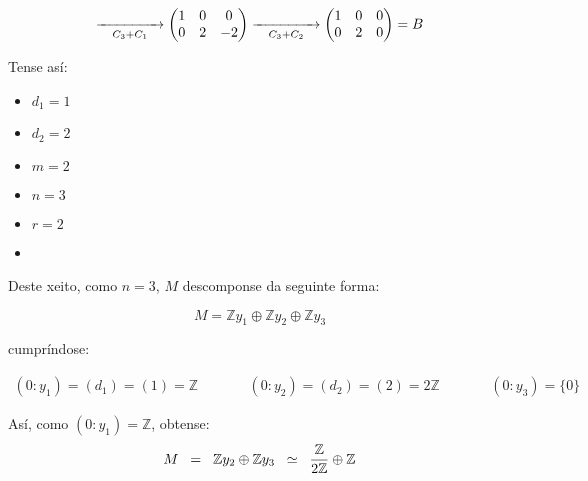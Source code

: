 \documentclass[twoside]{report}
\theoremstyle{mystyle}
\begin{document}
\vspace{3mm}

$$
\underset{C_{3} + C_{1}}{\xrightarrow{\hspace{15mm}}}
\begin{pmatrix}
1 & 0 & 0 \\
0 & 2 & -2
\end{pmatrix}
\underset{C_{3} + C_{2}}{\xrightarrow{\hspace{15mm}}}
\begin{pmatrix}
1 & 0 & 0 \\
0 & 2 & 0
\end{pmatrix}
= B
$$

\vspace{3mm}

\noindent Tense así:

\begin{multicols}{3}
\begin{itemize}
    \item $d_{1} = 1$
    \item $d_{2} = 2$
    \item $m = 2$
    \item $n = 3$
    \item $r = 2$
    \item[\vspace{\fill}]
\end{itemize}
\end{multicols}

\vspace{3mm}

\noindent Deste xeito, como $n = 3$, $M$ descomponse da seguinte forma:

$$M = \mathbb{Z}y_{1} \oplus \mathbb{Z}y_{2} \oplus \mathbb{Z}y_{3}$$

\vspace{3mm}

\noindent cumpríndose:

\begin{align*}
    (0 : y_{1}) = (d_{1}) = (1) = \mathbb{Z} & \qquad &  (0:y_{2}) = (d_{2}) = (2) = 2\mathbb{Z} & \qquad & (0 : y_{3}) = \{0\}
\end{align*}

\pagebreak

\noindent Así, como $(0 : y_{1}) = \mathbb{Z}$, obtense: 
$$M \hspace{2mm} = \hspace{2mm} \mathbb{Z}y_{2} \oplus \mathbb{Z}y_{3} \hspace{2mm} \simeq \hspace{2mm} \displaystyle \frac{\mathbb{Z}}{2\mathbb{Z}} \oplus \mathbb{Z}$$
\end{document}
